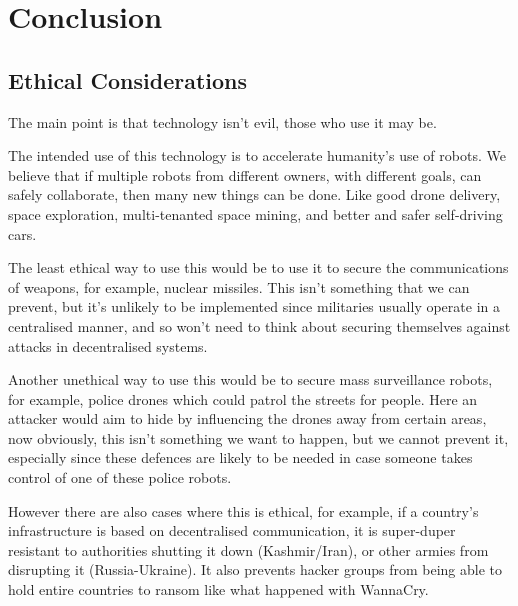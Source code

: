 \chapter{Conclusion}

\section{Ethical Considerations}

The main point is that technology isn't evil, those who use it may be.

The intended use of this technology is to accelerate humanity's use of robots. We believe that if multiple robots from different owners, with different goals, can safely collaborate, then many new things can be done. Like good drone delivery, space exploration, multi-tenanted space mining, and better and safer self-driving cars.

The least ethical way to use this would be to use it to secure the communications of weapons, for example, nuclear missiles. This isn't something that we can prevent, but it's unlikely to be implemented since militaries usually operate in a centralised manner, and so won't need to think about securing themselves against attacks in decentralised systems.

Another unethical way to use this would be to secure mass surveillance robots, for example, police drones which could patrol the streets for people. Here an attacker would aim to hide by influencing the drones away from certain areas, now obviously, this isn't something we want to happen, but we cannot prevent it, especially since these defences are likely to be needed in case someone takes control of one of these police robots.

However there are also cases where this is ethical, for example, if a country's infrastructure is based on decentralised communication, it is super-duper resistant to authorities shutting it down (Kashmir/Iran), or other armies from disrupting it (Russia-Ukraine). It also prevents hacker groups from being able to hold entire countries to ransom like what happened with WannaCry.

